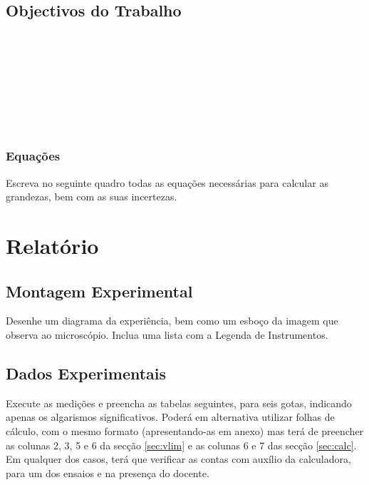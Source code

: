 \documentclass[a4paper,12pt]{article}  %
\begin{document}
\subsection{\sf Objectivos do Trabalho}
\noindent\underline{\makebox[\textwidth][r]{~}} \\
\noindent\underline{\makebox[\textwidth][r]{~}} \\
\noindent\underline{\makebox[\textwidth][r]{~}} \\
\noindent\underline{\makebox[\textwidth][r]{~}} \\
\noindent\underline{\makebox[\textwidth][r]{~}} \\
\noindent\underline{\makebox[\textwidth][r]{~}} \\
\noindent\underline{\makebox[\textwidth][r]{~}} \\

\subsubsection{\sf Equações }
Escreva no seguinte quadro todas as equações necessárias para calcular as grandezas, bem com as suas incertezas.
\begin{center}
\framebox[18cm]{\rule{0pt}{8.5cm}}
\end{center}


\section{\sf Relatório}
\subsection{\sf Montagem Experimental}
Desenhe um diagrama da experiência, bem como um esboço da imagem que observa ao microscópio. Inclua uma lista com a Legenda de Instrumentos.
\begin{center}
\framebox[18cm]{\rule{0pt}{8.5cm}}
\end{center}

\subsection{\sf Dados Experimentais}\label{sec:dados}
Execute as medições e preencha as tabelas seguintes, para seis gotas, indicando  apenas os algarismos significativos. Poderá em alternativa utilizar folhas de cálculo, com o mesmo formato (apresentando-as em anexo) mas terá de preencher as colunas 2, 3, 5 e 6 da secção \ref{sec:vlim} e as colunas 6 e 7 das secção \ref{sec:calc}. Em qualquer dos casos, terá que verificar as contas com auxílio da calculadora, para um dos ensaios e na presença do docente.
\end{document}
